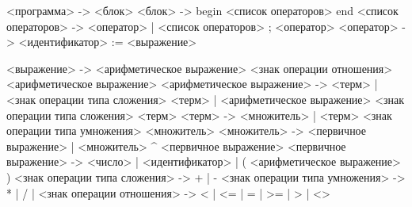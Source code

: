 <программа> -> <блок>
<блок> -> begin <список операторов> end
<список операторов> -> <оператор> | <список операторов> ; <оператор>
<оператор> -> <идентификатор> := <выражение>

<выражение> -> <арифметическое выражение> <знак операции отношения> <арифметическое выражение>
<арифметическое выражение> -> <терм> | <знак операции типа сложения> <терм> | <арифметическое выражение> <знак операции типа сложения> <терм>
<терм> -> <множитель> | <терм> <знак операции типа умножения> <множитель>
<множитель> -> <первичное выражение> | <множитель> ^ <первичное выражение>
<первичное выражение> -> <число> | <идентификатор> | ( <арифметическое выражение> )
<знак операции типа сложения> -> + | -
<знак операции типа умножения> -> * | / | %
<знак операции отношения> -> < | <= | = | >= | > | <>
